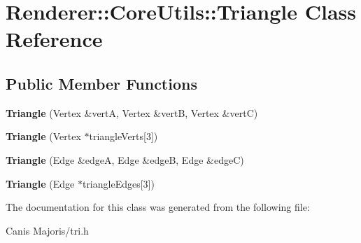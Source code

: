 \hypertarget{class_renderer_1_1_core_utils_1_1_triangle}{\section{Renderer\+:\+:Core\+Utils\+:\+:Triangle Class Reference}
\label{class_renderer_1_1_core_utils_1_1_triangle}
}
\subsection*{Public Member Functions}
\begin{DoxyCompactItemize}
\item 
\hypertarget{class_renderer_1_1_core_utils_1_1_triangle_a99f7a0f356443a59ad8f9d7bab5b3e6a}{{\bfseries Triangle} (Vertex \&vert\+A, Vertex \&vert\+B, Vertex \&vert\+C)}\label{class_renderer_1_1_core_utils_1_1_triangle_a99f7a0f356443a59ad8f9d7bab5b3e6a}

\item 
\hypertarget{class_renderer_1_1_core_utils_1_1_triangle_a3227c704ba7f8f4dac4447aa3f0242f7}{{\bfseries Triangle} (Vertex $\ast$triangle\+Verts\mbox{[}3\mbox{]})}\label{class_renderer_1_1_core_utils_1_1_triangle_a3227c704ba7f8f4dac4447aa3f0242f7}

\item 
\hypertarget{class_renderer_1_1_core_utils_1_1_triangle_a5a1588281397c1f72014fa102ba09767}{{\bfseries Triangle} (Edge \&edge\+A, Edge \&edge\+B, Edge \&edge\+C)}\label{class_renderer_1_1_core_utils_1_1_triangle_a5a1588281397c1f72014fa102ba09767}

\item 
\hypertarget{class_renderer_1_1_core_utils_1_1_triangle_a19eb486f654c659c6d98dad25cf7ce19}{{\bfseries Triangle} (Edge $\ast$triangle\+Edges\mbox{[}3\mbox{]})}\label{class_renderer_1_1_core_utils_1_1_triangle_a19eb486f654c659c6d98dad25cf7ce19}

\end{DoxyCompactItemize}


The documentation for this class was generated from the following file\+:\begin{DoxyCompactItemize}
\item 
Canis Majoris/tri.\+h\end{DoxyCompactItemize}
